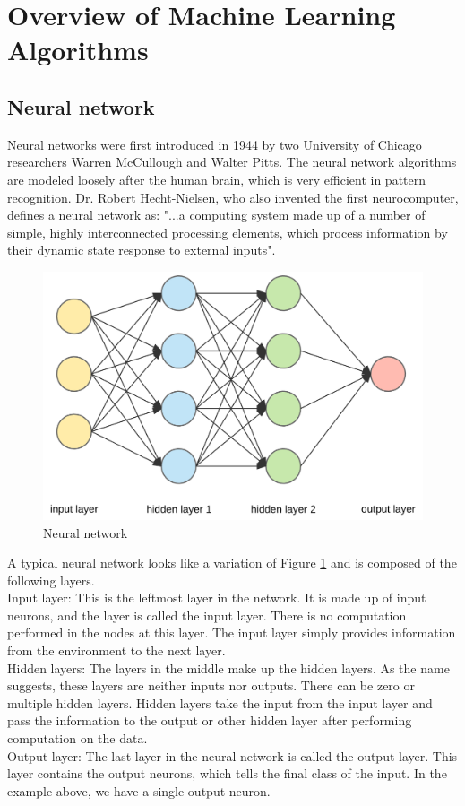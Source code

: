 \section{Overview of Machine Learning Algorithms}
\subsection{Neural network}
Neural networks were first introduced in 1944 by two University of Chicago researchers Warren McCullough and Walter Pitts. The neural network algorithms are modeled loosely after the human brain, which is very efficient in pattern recognition.  Dr. Robert Hecht-Nielsen, who also invented the first neurocomputer, defines a neural network as:
"...a computing system made up of a number of simple, highly interconnected processing elements, which process information by their dynamic state response to external inputs"\cite{Caudill}.
\begin{figure}[htb!]
    \centering
    \includegraphics[scale=0.15]{files/nn.png}
    \caption{Neural network}
    \label{Neural network}
    \end{figure}
    \FloatBarrier
A typical neural network looks like a variation of Figure \ref{Neural network} and is composed of the following layers. \\
Input layer: This is the leftmost layer in the network. It is made up of input neurons, and the layer is called the input layer. There is no computation performed in the nodes at this layer. The input layer simply provides information from the environment to the next layer. \\
Hidden layers: The layers in the middle make up the hidden layers. As the name suggests, these layers are neither inputs nor outputs. There can be zero or multiple hidden layers. Hidden layers take the input from the input layer and pass the information to the output or other hidden layer after performing computation on the data. \\
Output layer: The last layer in the neural network is called the output layer. This layer contains the output neurons, which tells the final class of the input. In the example above, we have a single output neuron. \\

